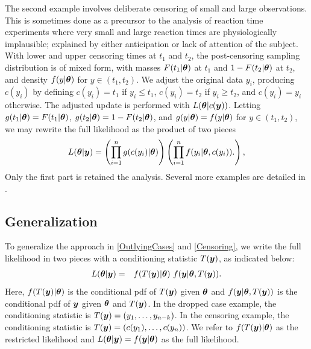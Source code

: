 \documentclass[12pt]{article}
\def\bth{\mbox{\boldmath $\theta$}}
\newcommand{\by}{\mbox{\boldmath $y$}}
\begin{document}
The second example involves deliberate censoring of small and large observations. This is
sometimes done as a precursor to the analysis of reaction time experiments  \citep[e.g.,][]{ratcliff1993} where very small and large reaction times are physiologically implausible;  explained by either anticipation or lack of attention of the subject.  
With lower and upper censoring times at $t_1$ and $t_2$, the post-censoring sampling distribution is of mixed form, with masses $F(t_1|\bth)$ at $t_1$ and $1-F(t_2|\bth)$ at $t_2$,
and density $f(y | \bth)$ for $y \in (t_1, t_2)$.  We adjust the original data $y_i$,
producing $c(y_i)$ by defining $c(y_i)= t_1$ if $y_i \leq t_1$, $c(y_i)=t_2$ 
if $y_i \geq t_2$, and $c(y_i)=y_i$ otherwise.  
The adjusted update is performed with $L(\bth |c(\by))$.  
Letting $g(t_1|\bth) = F(t_1|\bth)$,
$g(t_2 | \bth) = 1 - F(t_2|\bth)$, and $g(y|\bth)=f(y|\bth)$ for
$y \in (t_1, t_2)$, we may rewrite the full 
likelihood as the product of two pieces
\begin{eqnarray}
\label{Censoring} 
L(\bth | \by) =  \left( \prod_{i=1}^n g(c(y_i)  | \bth) \right) \left( \prod_{i=1}^n f(y_i|\bth,c(y_i)). \right) ,  
\end{eqnarray}
Only the first part is retained the analysis. Several more examples are detailed in \cite{lewis2014}.



\subsection{Generalization}

To generalize the approach in \eqref{OutlyingCases} and
\eqref{Censoring}, %
we write the full likelihood in two pieces with a conditioning statistic $T(\by)$, as indicated below:
\begin{eqnarray}
\label{FullLikelihood}
L(\bth | \by)  
& = & f(T(\by) | \bth) \,\, f(\by |\bth, T(\by)) .  
\end{eqnarray}
Here,  $f(T(\by) | \bth)$ is the conditional pdf of $T(\by)$ given $\bth$ and $f(\by |\bth, T(\by))$ is the conditional pdf of $\by$ given $\bth$ and $T(\by)$.  In the dropped case example, the conditioning statistic is $T(\by) = (y_1, \ldots, y_{n-k})$.  In 
the censoring example, the conditioning statistic is $T(\by) = (c(y_1),\ldots,c(y_n))$.  We refer to 
$f(T(\by) | \bth)$ as the restricted likelihood and $L(\bth | \by)=f(\by|\bth)$ as the full likelihood.  
\end{document}
